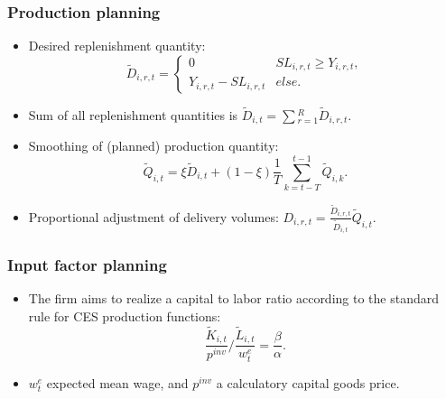 \documentclass{beamer}
\begin{document}
\frame
{
  \frametitle{Production planning} 
\begin{itemize}

\item Desired replenishment quantity:
	\[
			\tilde{D}_{i,r,t}= \begin{cases} 0 & SL_{i,r,t}\geq Y_{i,r,t},\\
																			Y_{i,r,t} -  SL_{i,r,t} &else. 
			
			 \end{cases}
	\]

	\item Sum of all replenishment quantities is $\tilde{D}_{i,t}=\sum{}_{r=1}^R \tilde{D}_{i,r,t}.$
	
	\item Smoothing of (planned) production quantity: 
	 \[
	 \tilde{Q}_{i,t}=\xi \tilde{D}_{i,t} + (1-\xi)\frac{1}{T}\sum_{k=t-T}^{t-1}\tilde{Q}_{i,k}.
	 \]
	
	\item Proportional adjustment of delivery volumes: $D_{i,r,t}=\frac{ \tilde{D}_{i,r,t}}{\tilde{D}_{i,t}}\tilde{Q}_{i,t}.$
	\end{itemize}


}



\frame
{

  \frametitle{Input factor planning} 
\begin{itemize}
	\item The firm aims to realize a capital to labor ratio according to the standard rule for CES production functions: 
		\[
	\frac{\tilde K_{i,t}}{p^{inv}} / \frac{\tilde L_{i,t}}{w_t^e} =\frac{\beta}{\alpha}.
	\]
	\item $w_t^e$ expected mean wage, and $p^{inv}$ a calculatory capital goods price.

	
	
	
\end{itemize}

}
\end{document}
